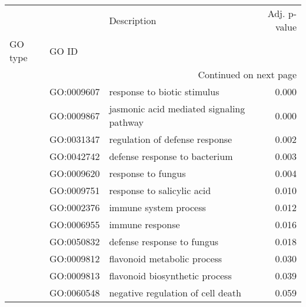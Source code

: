 \begin{longtable}{lllr}
\toprule
   &            &                               Description &  Adj. p-value \\
GO type & GO ID &                                           &               \\
\midrule
\endhead
\midrule
\multicolumn{4}{r}{{Continued on next page}} \\
\midrule
\endfoot

\bottomrule
\endlastfoot
\multirow{12}{*}{BP} & GO:0009607 &               response to biotic stimulus &         0.000 \\
   & GO:0009867 &  jasmonic acid mediated signaling pathway &         0.000 \\
   & GO:0031347 &            regulation of defense response &         0.002 \\
   & GO:0042742 &             defense response to bacterium &         0.003 \\
   & GO:0009620 &                        response to fungus &         0.004 \\
   & GO:0009751 &                response to salicylic acid &         0.010 \\
   & GO:0002376 &                     immune system process &         0.012 \\
   & GO:0006955 &                           immune response &         0.016 \\
   & GO:0050832 &                defense response to fungus &         0.018 \\
   & GO:0009812 &               flavonoid metabolic process &         0.030 \\
   & GO:0009813 &            flavonoid biosynthetic process &         0.039 \\
   & GO:0060548 &         negative regulation of cell death &         0.059 \\
\end{longtable}
